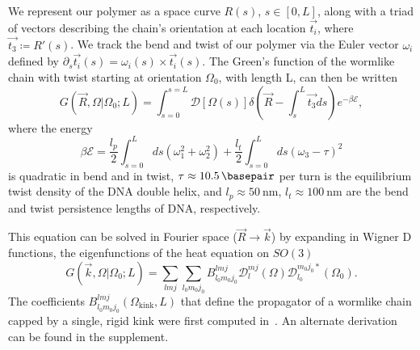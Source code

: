 \documentclass[%
 reprint,
superscriptaddress,
showpacs,preprintnumbers,
 amsmath,amssymb,
 aps,
 prl,
]{revtex4-1}
\newcommand{\greens}[2][\Omega_0; L]{G(#2|#1)}
\newcommand{\pathd}[1]{\mathcal{D}\left[#1\right]}
\newcommand{\energy}{\mathcal{E}}
\newcommand{\wigD}{\mathcal{D}}
\begin{document}
We represent our polymer as a space curve $R(s)$, $s\in[0,L]$, along with a
    triad of vectors describing the chain's orientation at each location
    $\vec{t_i}$, where $\vec{t_3} \coloneqq R'(s)$.
We track the bend and twist of our polymer via the Euler vector $\omega_i$
    defined by $\partial_s \vec{t_i}(s) = \omega_i(s) \times \vec{t_i}(s)$.
The Green's function of the wormlike chain with twist starting at orientation
    $\Omega_0$, with length L, can then be written
\begin{equation}\label{eq:path}
    \greens{\vec{R}, \Omega} = \int_{s=0}^{s=L} \pathd{\Omega(s)}
              \delta\left(\vec{R} - \int_{s}^L \vec{t_3} ds\right)
              e^{-\beta \mathcal{E}},
\end{equation}
    where the energy
\begin{equation}\label{eq:energy}
    \beta\energy = \frac{l_p}{2}\int_{s=0}^L ds
    (\omega_1^2 + \omega_2 ^2) + \frac{l_t}{2}\int_{s=0}^L ds
    {\left(\omega_3 - \tau\right)}^2
\end{equation}
    is quadratic in bend and in twist, {$\tau \approx \SI{10.5}{\basepair}$}
    per turn is the equilibrium twist density of the DNA double helix, and {$l_p
    \approx \SI{50}{\nano\metre}$}, {$l_t \approx \SI{100}{\nano\metre}$} are
    the bend and twist persistence lengths of DNA, respectively.

This equation can be solved in Fourier space ($\vec{R} \rightarrow \vec{k}$) by
    expanding in Wigner D functions, the eigenfunctions of the heat equation on
    $SO(3)$~\cite{yamakawa1999}
\begin{equation}\label{eq:expansion}
    \greens{\vec{k}, \Omega} = \sum_{l m j}\sum_{l_0 m_0 j_0} B_{l_0 m_0 j_0}^{lmj}
        \wigD_l^{mj}(\Omega)\wigD_{l_0}^{m_0 j_0 *}(\Omega_0).
\end{equation}
The coefficients $B_{l_0 m_0 j_0}^{lmj}(\Omega_\text{kink}, L)$ that define the
    propagator of a wormlike chain capped by a single, rigid kink were first
    computed
    in~\cite{zhou2003}.
An alternate derivation can be found in the supplement.
\end{document}
